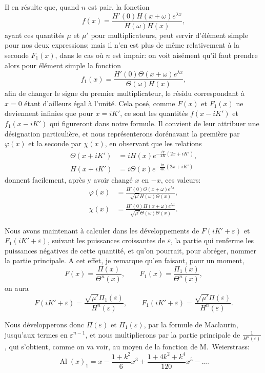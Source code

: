 \documentclass[11pt,leqno,oneside,letterpaper]{book}[2005/09/16]
\DeclareMathOperator{\Al}{Al}
\begin{document}
Il en r\'esulte que, quand $n$ est pair, la fonction
\[
f(x) = \frac{ H'(0) H(x+\omega) e^{\lambda x}}{H(\omega) H(x) },
\]
ayant ces quantit\'es $\mu$ et $\mu'$ pour multiplicateurs, peut servir d'\'el\'ement
simple pour nos deux expressions; mais il n'en est plus de m\^eme relativement
\`a la seconde $F_1(x)$, dans le cas o\`u $n$ est impair: on voit ais\'ement qu'il
faut prendre alors pour \'el\'ement simple la fonction
\[
f_1(x) =
\frac{H'(0) \Theta(x+\omega) e^{\lambda x}}{\Theta(\omega) H(x)} ,
\]
afin de changer le signe du premier multiplicateur, le r\'esidu correspondant
\`a $x = 0$ \'etant d'ailleurs \'egal \`a l'unit\'e. Cela pos\'e, comme $F(x)$ et $F_1(x)$
ne deviennent infinies que pour $x = iK'$, ce sont les quantit\'es $f(x-iK')$
et $f_1(x-iK')$ qui figureront dans notre formule. Il convient de leur
attribuer une d\'esignation particuli\`ere, et nous repr\'esenterons dor\'enavant
la premi\`ere par $\varphi(x)$\label{page8} et la seconde par $\chi(x)$, en observant que les relations
\begin{align*}
\Theta(x+iK') &=
iH(x) e^{-\frac{i\pi}{4K}(2x+iK')} ,\\
H(x+iK') &=
i\Theta(x) e^{-\frac{i\pi}{4K}(2x+iK')}
\end{align*}
donnent facilement, apr\`es y avoir chang\'e $x$ en $-x$, ces valeurs:
\begin{align*}
\varphi(x) &=
\frac{H'(0) \Theta(x+\omega) e^{\lambda x}}{\sqrt{\mu'} H(\omega) \Theta(x)}, \\
\chi(x) &=
\frac{H'(0) H(x+\omega) e^{\lambda x}}{\sqrt{\mu'} \Theta(\omega) \Theta(x)}.
\end{align*}

Nous avons maintenant \`a calculer dans les d\'eveloppements de
$F(iK'+\varepsilon)$ et $F_1(iK' + \varepsilon)$, suivant les puissances croissantes de $\varepsilon$, la partie
qui renferme les puissances n\'egatives de cette quantit\'e, et qu'on pourrait,
pour abr\'eger, nommer la partie principale. A cet effet, je remarque qu'en
faisant, pour un moment,
\[
F(x) = \frac{\Pi(x)}{\Theta^n(x)}, \qquad
F_1(x) = \frac{\Pi_1(x)}{\Theta^n(x)},
\]
on aura
\[
F(iK' +\varepsilon) = \frac{\sqrt{\mu'} \Pi_1(\varepsilon)}{H^n(\varepsilon)}, \qquad
F_1(iK' +\varepsilon) = \frac{\sqrt{\mu'} \Pi(\varepsilon)}{H^n(\varepsilon)}.
\]

Nous d\'evelopperons donc $\Pi(\varepsilon)$ et $\Pi_1(\varepsilon)$, par la formule de Maclaurin,
jusqu'aux termes en $\varepsilon^{n-1}$, et nous multiplierons par la partie principale de
$\frac{1}{H^n(\varepsilon)}$, qui s'obtient, comme on va voir, au moyen de la fonction de
M.~Weier\-strass:
\[
\Al(x)_1 = x - \frac{1+k^2}{6} x^3 + \frac{1+4k^2+k^4}{120} x^5 - \ldots.
\]
\end{document}
